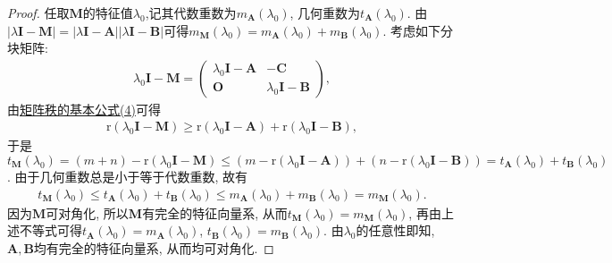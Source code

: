 \documentclass[../../main.tex]{subfiles}
\begin{document}
\begin{proof} 
任取\(\boldsymbol{M}\)的特征值\(\lambda_0\),记其代数重数为\(m_{\boldsymbol{A}}(\lambda_0)\), 几何重数为\(t_{\boldsymbol{A}}(\lambda_0)\).  由\(|\lambda\boldsymbol{I}-\boldsymbol{M}| = |\lambda\boldsymbol{I} - \boldsymbol{A}||\lambda\boldsymbol{I} - \boldsymbol{B}|\)可得\(m_{\boldsymbol{M}}(\lambda_0) = m_{\boldsymbol{A}}(\lambda_0)+m_{\boldsymbol{B}}(\lambda_0)\). 考虑如下分块矩阵:
\begin{align*}
\lambda_0\boldsymbol{I} - \boldsymbol{M} = \begin{pmatrix}
\lambda_0\boldsymbol{I} - \boldsymbol{A}&-\boldsymbol{C}\\
\boldsymbol{O}&\lambda_0\boldsymbol{I} - \boldsymbol{B}
\end{pmatrix},
\end{align*}
由\hyperref[矩阵秩的基本公式4]{矩阵秩的基本公式(4)}可得
\begin{align*}
\mathrm{r}(\lambda_0\boldsymbol{I} - \boldsymbol{M})\geq \mathrm{r}(\lambda_0\boldsymbol{I} - \boldsymbol{A})+\mathrm{r}(\lambda_0\boldsymbol{I} - \boldsymbol{B}),
\end{align*}
于是\(t_{\boldsymbol{M}}(\lambda_0) = (m + n) - \mathrm{r}(\lambda_0\boldsymbol{I} - \boldsymbol{M})\leq (m - \mathrm{r}(\lambda_0\boldsymbol{I} - \boldsymbol{A}))+(n - \mathrm{r}(\lambda_0\boldsymbol{I} - \boldsymbol{B})) = t_{\boldsymbol{A}}(\lambda_0)+t_{\boldsymbol{B}}(\lambda_0)\). 由于几何重数总是小于等于代数重数, 故有
\begin{align*}
t_{\boldsymbol{M}}(\lambda_0)\leq t_{\boldsymbol{A}}(\lambda_0)+t_{\boldsymbol{B}}(\lambda_0)\leq m_{\boldsymbol{A}}(\lambda_0)+m_{\boldsymbol{B}}(\lambda_0) = m_{\boldsymbol{M}}(\lambda_0).
\end{align*}
因为\(\boldsymbol{M}\)可对角化, 所以\(\boldsymbol{M}\)有完全的特征向量系, 从而\(t_{\boldsymbol{M}}(\lambda_0) = m_{\boldsymbol{M}}(\lambda_0)\), 再由上述不等式可得\(t_{\boldsymbol{A}}(\lambda_0) = m_{\boldsymbol{A}}(\lambda_0)\), \(t_{\boldsymbol{B}}(\lambda_0) = m_{\boldsymbol{B}}(\lambda_0)\). 由\(\lambda_0\)的任意性即知, \(\boldsymbol{A},\boldsymbol{B}\)均有完全的特征向量系, 从而均可对角化. 
\end{proof}
\end{document}
